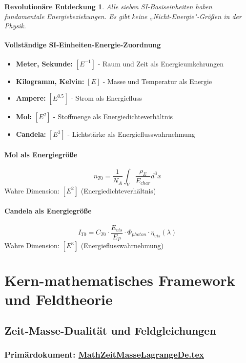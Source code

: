 \documentclass[12pt,a4paper]{report}
\newtheorem{discovery}{Revolutionäre Entdeckung}[chapter]
\begin{document}
	\begin{discovery}
		Alle sieben SI-Basiseinheiten haben fundamentale Energiebeziehungen. Es gibt keine „Nicht-Energie"-Größen in der Physik.
	\end{discovery}
	
	\subsubsection{Vollständige SI-Einheiten-Energie-Zuordnung}
	\begin{itemize}
		\item \textbf{Meter, Sekunde:} $[E^{-1}]$ - Raum und Zeit als Energieumkehrungen
		\item \textbf{Kilogramm, Kelvin:} $[E]$ - Masse und Temperatur als Energie
		\item \textbf{Ampere:} $[E^{0.5}]$ - Strom als Energiefluss
		\item \textbf{Mol:} $[E^2]$ - Stoffmenge als Energiedichteverhältnis
		\item \textbf{Candela:} $[E^3]$ - Lichtstärke als Energieflusswahrnehmung
	\end{itemize}
	
	\subsubsection{Mol als Energiegröße}
	$$n_{T0} = \frac{1}{N_A} \int_V \frac{\rho_E}{E_{char}} d^3x$$
	Wahre Dimension: $[E^2]$ (Energiedichteverhältnis)
	
	\subsubsection{Candela als Energiegröße}
	$$I_{T0} = C_{T0} \cdot \frac{E_{vis}}{E_P} \cdot \Phi_{photon} \cdot \eta_{vis}(\lambda)$$
	Wahre Dimension: $[E^3]$ (Energieflusswahrnehmung)
	
	\chapter{Kern-mathematisches Framework und Feldtheorie}
	
	\section{Zeit-Masse-Dualität und Feldgleichungen}
	\subsection{Primärdokument: \href{https://github.com/jpascher/T0-Time-Mass-Duality/tree/main/2/pdf/MathZeitMasseLagrangeDe.pdf}{MathZeitMasseLagrangeDe.tex}}
	
\end{document}
